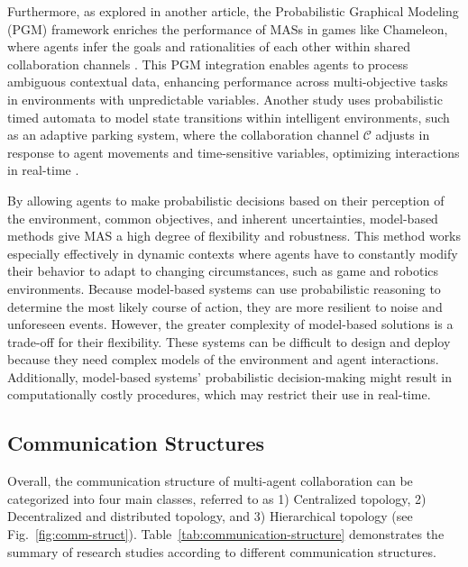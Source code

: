 \documentclass[acmsmall,nonacm]{acmart}
\begin{document}
        Furthermore, as explored in another article, the Probabilistic Graphical Modeling (PGM) framework enriches the performance of MASs in games like Chameleon, where agents infer the goals and rationalities of each other within shared collaboration channels \cite{xu2023magic}. This PGM integration enables agents to process ambiguous contextual data, enhancing performance across multi-objective tasks in environments with unpredictable variables. Another study uses probabilistic timed automata to model state transitions within intelligent environments, such as an adaptive parking system, where the collaboration channel $\mathcal{C}$ adjusts in response to agent movements and time-sensitive variables, optimizing interactions in real-time \cite{mu2023runtime}.

        By allowing agents to make probabilistic decisions based on their perception of the environment, common objectives, and inherent uncertainties, model-based methods give MAS a high degree of flexibility and robustness. This method works especially effectively in dynamic contexts where agents have to constantly modify their behavior to adapt to changing circumstances, such as game and robotics environments. Because model-based systems can use probabilistic reasoning to determine the most likely course of action, they are more resilient to noise and unforeseen events. However, the greater complexity of model-based solutions is a trade-off for their flexibility. These systems can be difficult to design and deploy because they need complex models of the environment and agent interactions. Additionally, model-based systems' probabilistic decision-making might result in computationally costly procedures, which may restrict their use in real-time.
        
        
    \subsection{Communication Structures}
    Overall, the communication structure of multi-agent collaboration can be categorized into four main classes, referred to as 1) Centralized topology, 2) Decentralized and distributed topology, and 3) Hierarchical topology (see Fig.~\ref{fig:comm-struct}). Table~\ref{tab:communication-structure} demonstrates the summary of research studies according to different communication structures.
    
\end{document}
